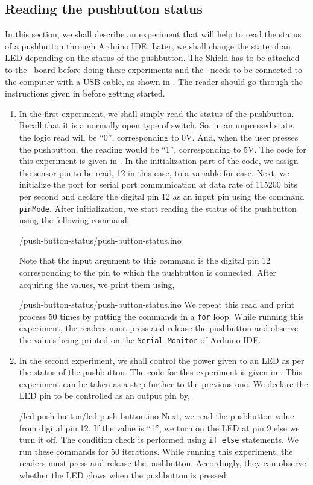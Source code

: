 \subsection{Reading the pushbutton status}
In this section, we shall describe an experiment that will help 
to read the status of a pushbutton through Arduino IDE. 
Later, we shall change the state of an LED depending on the status of the pushbutton. The Shield has to be attached to the \arduino\ board
before doing these experiments and the \arduino\ needs to be connected to the computer 
with a USB cable, as shown in . The reader should go through the
instructions given in  before getting started.
\begin{enumerate}
\item In the first experiment, we shall simply read the status of the
  pushbutton. Recall that it is a normally open type of switch. So, in
  an unpressed state, the logic read will be ``0'', corresponding to
  0V. And, when the user presses the pushbutton, the reading would be
  ``1'', corresponding to 5V. The code for this experiment is given in
  . In the initialization part of the code, we
  assign the sensor pin to be read, 12 in this case, to a variable for
  ease. Next, we initialize the port for serial port communication at
  data rate of 115200 bits per second and declare the digital pin 12 as an 
  input pin using the command {\tt pinMode}.  After initialization, 
  we start reading the status of the pushbutton using the following command:
  
  {\LocPushardcode/push-button-status/push-button-status.ino}

  Note that the input argument to this command is the digital pin 12
  corresponding to the pin to which the pushbutton is connected.  After
  acquiring the values, we print them using,
  
  {\LocPushardcode/push-button-status/push-button-status.ino} We
  repeat this read and print process 50 times by putting the
  commands in a {\tt for} loop. While running this experiment, the readers must press
  and release the pushbutton and observe the values being printed on the
  {\tt Serial Monitor} of Arduino IDE.

\item In the second experiment, we shall control the power given to an
  LED as per the status of the pushbutton. The code for this
  experiment is given in . This experiment can be
  taken as a step further to the previous one. We declare the LED pin
  to be controlled as an output pin by,
  
  {\LocPushardcode/led-push-button/led-push-button.ino} Next, we read
  the pusbhutton value from digital pin 12. If the value is ``1'',
  we turn on the LED at pin 9 else we turn it off. The
  condition check is performed using {\tt if else} statements. We run
  these commands for 50 iterations. While running this experiment, the readers 
  must press and release the pushbutton. Accordingly, they can observe whether 
  the LED glows when the pushbutton is pressed. 
\end{enumerate}

